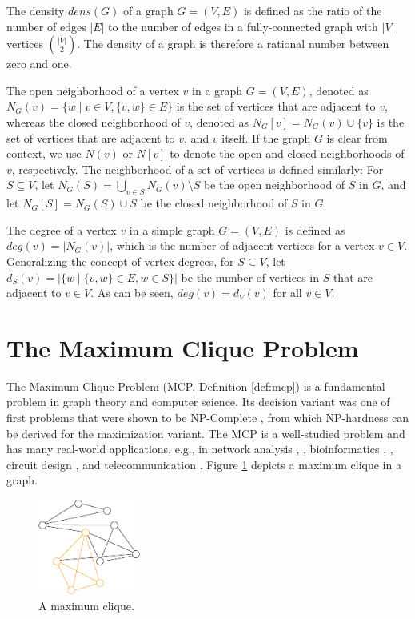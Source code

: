 \documentclass[draft,final]{vutinfth} %
\begin{document}
The density $\mathit{dens}(G)$ of a graph $G = (V,E)$ is defined as the ratio of the number of edges $|E|$ to the number of edges in a fully-connected graph with $|V|$ vertices $\binom{|V|}{2}$. 
The density of a graph is therefore a rational number between zero and one. 

The open neighborhood of a vertex $v$ in a graph $G = (V,E)$, denoted as $N_G(v) = \{ w \mid v \in V, \{v,w\} \in E\}$ is the set of vertices that are adjacent to $v$, whereas the closed neighborhood of $v$, denoted as $N_G[v] = N_G(v) \cup \{v\}$ is the set of vertices that are adjacent to $v$, and $v$ itself. 
If the graph $G$ is clear from context, we use $N(v)$ or $N[v]$ to denote the open and closed neighborhoods of $v$, respectively. 
The neighborhood of a set of vertices is defined similarly: For $S \subseteq V$, let $N_G(S) = \bigcup_{v \in S} N_G(v) \setminus S$ be the open neighborhood of $S$ in $G$, and let $N_G[S] = N_G(S) \cup S$ be the closed neighborhood of $S$ in $G$. 

The degree of a vertex $v$ in a simple graph $G = (V,E)$ is defined as $\mathit{deg}(v) = |N_G(v)|$, which is the number of adjacent vertices for a vertex $v \in V$. Generalizing the concept of vertex degrees, for $S \subseteq V$, let $d_S(v) = |\{w \mid \{v,w\} \in E, w \in S\}|$ be the number of vertices in $S$ that are adjacent to $v \in V$. As can be seen, $\mathit{deg}(v) = d_V(v) $ for all $v \in V$. 


\section{The Maximum Clique Problem}\label{sec:mcp}

The Maximum Clique Problem (MCP, Definition \ref{def:mcp}) is a fundamental problem in graph theory and computer science. Its decision variant was one of first problems that were shown to be NP-Complete \cite{Karp1972}, from which NP-hardness can be derived for the maximization variant. The MCP is a well-studied problem and has many real-world applications, e.g., in network analysis \cite{Fortunato09}, \cite{Palla2005}, bioinformatics \cite{Depolli2013}, \cite{BUTENKO20061}, circuit design \cite{LeckyMA89}, and telecommunication \cite{DouikSAA14}. 
Figure \ref{fig:maxclique} depicts a maximum clique in a graph. 
\begin{figure}
    \centering
    \includegraphics[width=0.3\textwidth]{graphics/graph1-clique.eps}
    \caption{A maximum clique.}
    \label{fig:maxclique}
\end{figure}
\end{document}

